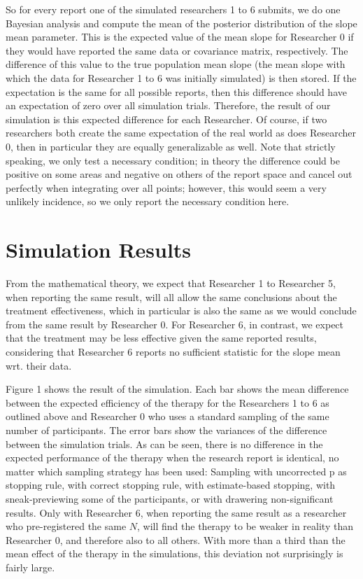 \documentclass[man]{apa7}
\theoremstyle{definition}
\begin{document}
So for every report one of the simulated researchers 1 to 6 submits, we do one Bayesian analysis and compute the mean of the posterior distribution of the slope mean parameter. This is the expected value of the mean slope for Researcher 0 if they would have reported the same data or covariance matrix, respectively. The difference of this value to the true population mean slope (the mean slope with which the data for Researcher 1 to 6 was initially simulated) is then stored. If the expectation is the same for all possible reports, then this difference should have an expectation of zero over all simulation trials. Therefore, the result of our simulation is this expected difference for each Researcher. Of course, if two researchers both create the same expectation of the real world as does Researcher 0, then in particular they are equally generalizable as well. Note that strictly speaking, we only test a necessary condition; in theory the difference could be positive on some areas and negative on others of the report space and cancel out perfectly when integrating over all points; however, this would seem a very unlikely incidence, so we only report the necessary condition here.

\section{Simulation Results}
From the mathematical theory, we expect that Researcher 1 to Researcher 5, when reporting the same result, will all allow the same conclusions about the treatment effectiveness, which in particular is also the same as we would conclude from the same result by Researcher 0. For Researcher 6, in contrast, we expect that the treatment may be less effective given the same reported results, considering that Researcher 6 reports no sufficient statistic for the slope mean wrt. their data. 

Figure 1 shows the result of the simulation. Each bar shows the mean difference between the expected efficiency of the therapy for the Researchers 1 to 6 as outlined above and Researcher 0 who uses a standard sampling of the same number of participants. The error bars show the variances of the difference between the simulation trials. As can be seen, there is no difference in the expected performance of the therapy when the research report is identical, no matter which sampling strategy has been used: Sampling with uncorrected p as stopping rule, with correct stopping rule, with estimate-based stopping, with sneak-previewing some of the participants, or with drawering non-significant results. Only with Researcher 6, when reporting the same result as a researcher who pre-registered the same $N$, will find the therapy to be weaker in reality than Researcher 0, and therefore also to all others. With more than a third than the mean effect of the therapy in the simulations, this deviation not surprisingly is fairly large. 
\end{document}
